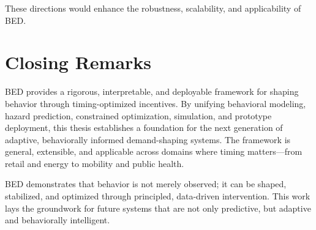 These directions would enhance the robustness, scalability, and applicability of
BED.

\section{Closing Remarks}

BED provides a rigorous, interpretable, and deployable framework for shaping
behavior through timing-optimized incentives. By unifying behavioral modeling,
hazard prediction, constrained optimization, simulation, and prototype
deployment, this thesis establishes a foundation for the next generation of
adaptive, behaviorally informed demand-shaping systems. The framework is
general, extensible, and applicable across domains where timing matters—from
retail and energy to mobility and public health.

BED demonstrates that behavior is not merely observed; it can be shaped,
stabilized, and optimized through principled, data-driven intervention. This
work lays the groundwork for future systems that are not only predictive, but
adaptive and behaviorally intelligent.
